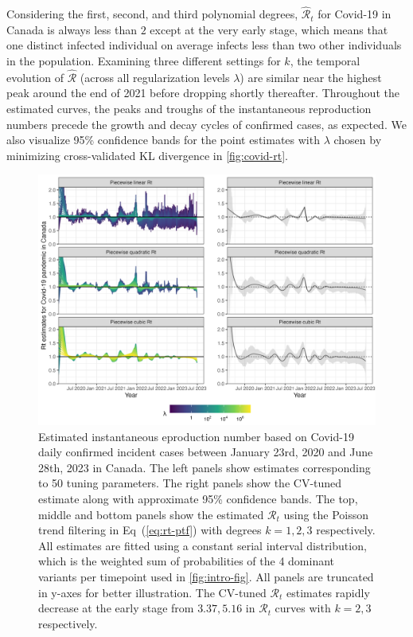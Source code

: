 \documentclass[10pt,letterpaper]{article}
\def\calR{\mathcal{R}}
\renewcommand{\eqref}[1]{Eq~(\ref{#1})}
\begin{document}
Considering the first, second, and third polynomial degrees, $\widehat{\calR}_t$
for Covid-19 in Canada is
always less than $2$ except at the very early stage, which means that one
distinct infected individual on average infects less than two other
individuals in the population. Examining three different settings for $k$, the
temporal evolution of $\widehat{\calR}$ (across all regularization levels
$\lambda$) are similar near the highest peak around the end of 2021 before
dropping shortly thereafter. Throughout the estimated curves, the peaks and
troughs of the instantaneous reproduction numbers precede the growth and decay cycles of
confirmed cases, as expected. We also visualize 95\% confidence bands for the
point estimates with $\lambda$ chosen by minimizing cross-validated KL
divergence in \autoref{fig:covid-rt}.     

\begin{figure}[!ht]
  \centering
  \includegraphics[width=0.99\linewidth]{fig/covid_full_res.png}
  \caption{Estimated instantaneous eproduction number based on Covid-19 daily
  confirmed incident cases between January 23rd, 2020 and June 28th, 2023 in
  Canada. The left panels show estimates corresponding to 50
  tuning parameters. The right panels show the CV-tuned estimate along with
  approximate 95\% confidence bands. The top, middle and bottom panels show the
  estimated $\calR_t$ using the Poisson trend filtering in \eqref{eq:rt-ptf}
  with degrees $k=1,2,3$ respectively. All estimates are fitted using a constant
  serial interval distribution, which is the weighted sum of probabilities of 
  the 4 dominant variants per timepoint used in \autoref{fig:intro-fig}. 
  All panels are truncated in y-axes for better illustration. The CV-tuned 
  $\calR_t$ estimates rapidly decrease at the early stage from $3.37,5.16$ 
  in $\calR_t$ curves with $k=2,3$ respectively.} 
  \label{fig:covid-rt}
\end{figure} 
\end{document}
